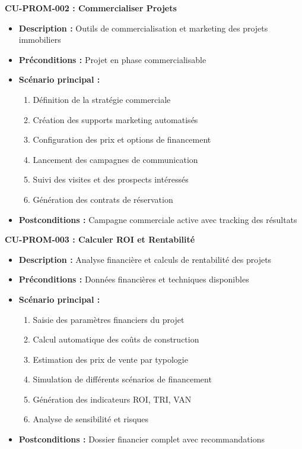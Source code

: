 \textbf{CU-PROM-002 : Commercialiser Projets}
\begin{itemize}
    \item \textbf{Description :} Outils de commercialisation et marketing des projets immobiliers
    \item \textbf{Préconditions :} Projet en phase commercialisable
    \item \textbf{Scénario principal :}
    \begin{enumerate}
        \item Définition de la stratégie commerciale
        \item Création des supports marketing automatisés
        \item Configuration des prix et options de financement
        \item Lancement des campagnes de communication
        \item Suivi des visites et des prospects intéressés
        \item Génération des contrats de réservation
    \end{enumerate}
    \item \textbf{Postconditions :} Campagne commerciale active avec tracking des résultats
\end{itemize}

\textbf{CU-PROM-003 : Calculer ROI et Rentabilité}
\begin{itemize}
    \item \textbf{Description :} Analyse financière et calculs de rentabilité des projets
    \item \textbf{Préconditions :} Données financières et techniques disponibles
    \item \textbf{Scénario principal :}
    \begin{enumerate}
        \item Saisie des paramètres financiers du projet
        \item Calcul automatique des coûts de construction
        \item Estimation des prix de vente par typologie
        \item Simulation de différents scénarios de financement
        \item Génération des indicateurs ROI, TRI, VAN
        \item Analyse de sensibilité et risques
    \end{enumerate}
    \item \textbf{Postconditions :} Dossier financier complet avec recommandations
\end{itemize}

